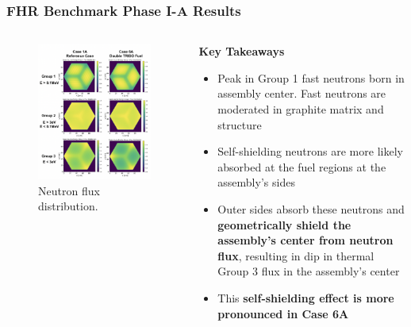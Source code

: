 \begin{frame}
    \frametitle{FHR Benchmark Phase I-A Results}
    \vspace{-0.35cm}
    \begin{columns}
        \begin{column}{0.5\textwidth}
            \begin{figure}
                \centering
                \includegraphics[width=\linewidth]{figures/phase1a-flux-vert.png} 
                \caption{Neutron flux distribution.}
            \end{figure}
        \end{column}
        \begin{column}{0.5\textwidth}
            \textbf{Key Takeaways} 
            \begin{itemize}
                \item Peak in Group 1 fast neutrons born in assembly center. Fast 
                neutrons are moderated in graphite matrix and structure 
                \item Self-shielding neutrons are more likely absorbed at the fuel 
                regions at the assembly's sides
                \item Outer sides absorb these neutrons and \textbf{geometrically 
                shield the assembly's center from neutron flux}, resulting in dip in 
                thermal Group 3 flux in the assembly's center
                \item This \textbf{self-shielding effect is more pronounced in Case 6A} 
            \end{itemize}
        \end{column}
    \end{columns}
\end{frame}

